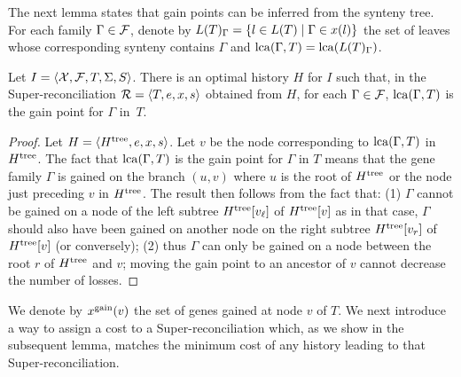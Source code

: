 The next lemma states that gain points can be inferred
from the synteny tree.  For each family \(\Gamma \in \mathcal{F}\), denote
by \(L(T)_\Gamma = \{l \in L(T) \mid \Gamma \in x(l)\}\)
the set of leaves whose corresponding synteny contains
\(\Gamma\) and \(\mathrm{lca}(\Gamma,T) = \mathrm{lca}(L(T)_\Gamma)\).

\begin{lemma}\label{lem:superdtl:gains}
    Let \(I = \left\langle\mathcal{X}, \mathcal{F}, T, \Sigma, S\right\rangle\).
    There is an optimal history \(H\) for \(I\) such that, in the Super-reconciliation \(\mathcal{R}= \left\langle T, e, x, s\right\rangle\) obtained from \(H\), for each \(\Gamma \in \mathcal{F}\), \(\mathrm{lca}(\Gamma,T)\) is the gain point for \(\Gamma\) in~\(T\).
\end{lemma}
\begin{proof}
    Let \(H = \left\langle H^\mathrm{tree}, e, x, s\right\rangle\).
    Let \(v\) be the node corresponding to \(\mathrm{lca}(\Gamma,T)\) in \(H^\mathrm{tree}\).
    The fact that \(\mathrm{lca}(\Gamma,T)\) is the gain point for \(\Gamma\) in \(T\) means that the gene family \(\Gamma\) is gained on the branch \((u,v)\) where \(u\) is the root of \(H^\mathrm{tree}\) or the node just preceding \(v\) in \(H^\mathrm{tree}\).
    The result then follows from the fact that:
    (1) \(\Gamma\) cannot be gained on a node of the left subtree \(H^\mathrm{tree}[v_\mathit{\ell}]\) of \(H^\mathrm{tree}[v]\) as in that case, \(\Gamma\) should also have been gained on another node on the right subtree \(H^\mathrm{tree}[v_r]\) of \(H^\mathrm{tree}[v]\) (or conversely);
    (2) thus \(\Gamma\) can only be gained on a node between the root \(r\) of \(H^\mathrm{tree}\) and \(v\); moving the gain point to an ancestor of \(v\) cannot decrease the number of losses.
\end{proof}

We denote by \(x^{\mathrm{gain}}(v)\) the set of genes gained at node \(v\) of \(T\).
We next introduce a way to assign a cost to a Super-reconciliation which, as we show in the subsequent lemma, matches the minimum cost of any history leading to that Super-reconciliation.

